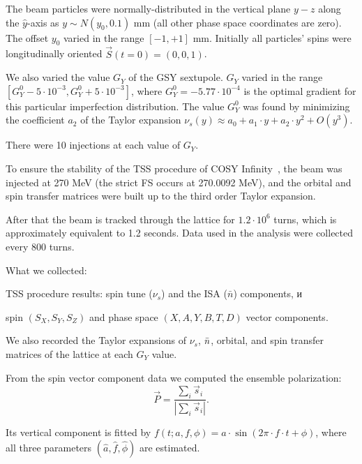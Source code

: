 The beam particles were normally-distributed in the vertical plane $y-z$ along the $\hat y$-axis
as $y\sim N(y_0, 0.1)$ mm (all other phase space coordinates are zero). The offset $y_0$ varied in the
range $[-1, +1]$ mm. Initially all particles' spins were longitudinally oriented $\vec S(t=0) = (0,0,1)$.

We also varied the value $G_Y$ of the GSY sextupole.
$G_Y$ varied in the range $[G_Y^0 - 5\cdot10^{-3}, G_Y^0 + 5\cdot10^{-3}]$, where
$G_Y^0=-5.77\cdot 10^{-4}$ is the optimal gradient for this particular imperfection distribution.
The value $G_Y^0$ was found by minimizing the coefficient $a_2$
of the Taylor expansion $\nu_s(y) \approx a_0 + a_1\cdot y + a_2\cdot y^2 + O(y^3)$.

There were 10 injections at each value of $G_Y$.

To ensure the stability of the TSS procedure of COSY Infinity~\cite{COSYINF:Manual:BeamPhys},
the beam was injected at 270 MeV (the strict FS occurs at 270.0092 MeV), and the orbital and
spin transfer matrices were built up to the third order Taylor expansion. 

After that the beam is tracked through the lattice for $1.2\cdot10^6$ turns, which is approximately
equivalent to 1.2 seconds. Data used in the analysis were collected every 800 turns.

What we collected:
\begin{enumerate*}
	\item TSS procedure results: spin tune ($\nu_s$)  and the ISA ($\bar n$) components, и
	\item spin $(S_X, S_Y, S_Z)$ and phase space $(X,A,Y,B,T,D)$ vector components.
\end{enumerate*}
We also recorded the Taylor expansions of $\nu_s$, $\bar n$, orbital, and spin transfer matrices
of the lattice at each $G_Y$ value.

From the spin vector component data we computed the ensemble polarization:
\begin{equation}\label{eq:polarization_formula}
\vec P = \frac{\sum_i\vec s_i}{|\sum_i\vec s_i|}.
\end{equation}

Its vertical component is fitted by $f(t; a,f,\phi) = a\cdot \sin(2\pi\cdot
f\cdot t + \phi)$, where all three parameters $(\hat a, \hat f, \hat\phi)$ are estimated.  

